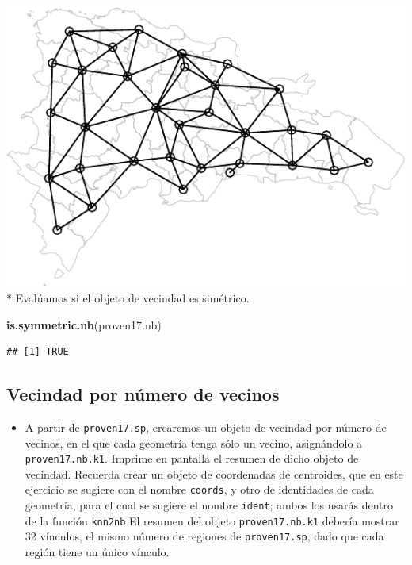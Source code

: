 \documentclass[11pt,]{article}
\newenvironment{Shaded}{\begin{snugshade}}{\end{snugshade}}
\newcommand{\KeywordTok}[1]{\textcolor[rgb]{0.13,0.29,0.53}{\textbf{#1}}}
\newcommand{\NormalTok}[1]{#1}
\providecommand{\tightlist}{%
\setlength{\itemsep}{0pt}\setlength{\parskip}{0pt}}
\begin{document}
\includegraphics{proyecto_files/figure-latex/unnamed-chunk-9-1.pdf} *
Evalúamos si el objeto de vecindad es simétrico.

\begin{Shaded}
\begin{Highlighting}[]
\KeywordTok{is.symmetric.nb}\NormalTok{(proven17.nb)}
\end{Highlighting}
\end{Shaded}

\begin{verbatim}
## [1] TRUE
\end{verbatim}

\subsection{Vecindad por número de
vecinos}\label{vecindad-por-nuxfamero-de-vecinos}

\begin{itemize}
\tightlist
\item
  A partir de \texttt{proven17.sp}, crearemos un objeto de vecindad por
  número de vecinos, en el que cada geometría tenga sólo un vecino,
  asignándolo a \texttt{proven17.nb.k1}. Imprime en pantalla el resumen
  de dicho objeto de vecindad. Recuerda crear un objeto de coordenadas
  de centroides, que en este ejercicio se sugiere con el nombre
  \texttt{coords}, y otro de identidades de cada geometría, para el cual
  se sugiere el nombre \texttt{ident}; ambos los usarás dentro de la
  función \texttt{knn2nb} El resumen del objeto \texttt{proven17.nb.k1}
  debería mostrar 32 vínculos, el mismo número de regiones de
  \texttt{proven17.sp}, dado que cada región tiene un único vínculo.
\end{itemize}
\end{document}
